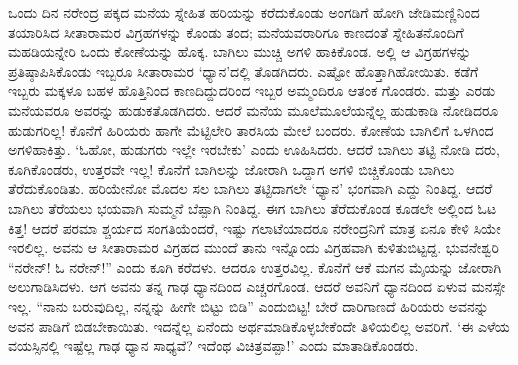 ಒಂದು ದಿನ ನರೇಂದ್ರ ಪಕ್ಕದ ಮನೆಯ ಸ್ನೇಹಿತ ಹರಿಯನ್ನು ಕರೆದುಕೊಂಡು ಅಂಗಡಿಗೆ ಹೋಗಿ ಜೇಡಿಮಣ್ಣಿನಿಂದ ತಯಾರಿಸಿದ ಸೀತಾರಾಮರ ವಿಗ್ರಹಗಳನ್ನು ಕೊಂಡು ತಂದ; ಮನೆಯವರಾರಿಗೂ ಕಾಣದಂತೆ ಸ್ನೇಹಿತನೊಂದಿಗೆ ಮಹಡಿಯನ್ನೇರಿ ಒಂದು ಕೋಣೆಯನ್ನು ಹೊಕ್ಕ. ಬಾಗಿಲು ಮುಚ್ಚಿ ಅಗಳಿ ಹಾಕಿಕೊಂಡ. ಅಲ್ಲಿ ಆ ವಿಗ್ರಹಗಳನ್ನು ಪ್ರತಿಷ್ಠಾಪಿಸಿಕೊಂಡು ಇಬ್ಬರೂ ಸೀತಾರಾಮರ ‘ಧ್ಯಾನ’ದಲ್ಲಿ ತೊಡಗಿದರು. ಎಷ್ಟೋ ಹೊತ್ತಾಗಿಹೋಯಿತು. ಕಡೆಗೆ ಇಬ್ಬರು ಮಕ್ಕಳೂ ಬಹಳ ಹೊತ್ತಿನಿಂದ ಕಾಣದಿದ್ದುದರಿಂದ ಇಬ್ಬರ ಅಮ್ಮಂದಿರೂ ಆತಂಕ ಗೊಂಡರು. ಮತ್ತು ಎರಡು ಮನೆಯವರೂ ಅವರನ್ನು ಹುಡುಕತೊಡಗಿದರು. ಆದರೆ ಮನೆಯ ಮೂಲೆಮೂಲೆಯನ್ನೆಲ್ಲ ಹುಡುಕಾಡಿ ನೋಡಿದರೂ ಹುಡುಗರಿಲ್ಲ! ಕೊನೆಗೆ ಹಿರಿಯರು ಹಾಗೇ ಮೆಟ್ಟಿಲೇರಿ ತಾರಸಿಯ ಮೇಲೆ ಬಂದರು. ಕೋಣೆಯ ಬಾಗಿಲಿಗೆ ಒಳಗಿಂದ ಅಗಳಿಹಾಕಿತ್ತು. ‘ಓಹೋ, ಹುಡುಗರು ಇಲ್ಲೇ ಇರಬೇಕು’ ಎಂದು ಊಹಿಸಿದರು. ಆದರೆ ಬಾಗಿಲು ತಟ್ಟಿ ನೋಡಿ ದರು, ಕೂಗಿಕೊಂಡರು, ಉತ್ತರವೇ ಇಲ್ಲ! ಕೊನೆಗೆ ಬಾಗಿಲನ್ನು ಜೋರಾಗಿ ಒದ್ದಾಗ ಅಗಳಿ ಬಿಚ್ಚಿಕೊಂಡು ಬಾಗಿಲು ತೆರೆದುಕೊಂಡಿತು. ಹರಿಯೇನೋ ಮೊದಲ ಸಲ ಬಾಗಿಲು ತಟ್ಟಿದಾಗಲೇ ‘ಧ್ಯಾನ’ ಭಂಗವಾಗಿ ಎದ್ದು ನಿಂತಿದ್ದ. ಆದರೆ ಬಾಗಿಲು ತೆರೆಯಲು ಭಯವಾಗಿ ಸುಮ್ಮನೆ ಬೆಪ್ಪಾಗಿ ನಿಂತಿದ್ದ. ಈಗ ಬಾಗಿಲು ತೆರೆದುಕೊಂಡ ಕೂಡಲೇ ಅಲ್ಲಿಂದ ಓಟ ಕಿತ್ತ! ಆದರೆ ಪರಮಾ ಶ್ಚರ್ಯದ ಸಂಗತಿಯೆಂದರೆ, ಇಷ್ಟು ಗಲಾಟೆಯಾದರೂ ನರೇಂದ್ರನಿಗೆ ಮಾತ್ರ ಏನೂ ಕೇಳಿ ಸಿಯೇ ಇರಲಿಲ್ಲ. ಅವನು ಆ ಸೀತಾರಾಮರ ವಿಗ್ರಹದ ಮುಂದೆ ತಾನು ಇನ್ನೊಂದು ವಿಗ್ರಹವಾಗಿ ಕುಳಿತುಬಿಟ್ಟದ್ದ. ಭುವನೇಶ್ವರಿ “ನರೇನ್! ಓ ನರೇನ್!” ಎಂದು ಕೂಗಿ ಕರೆದಳು. ಆದರೂ ಉತ್ತರವಿಲ್ಲ. ಕೊನೆಗೆ ಆಕೆ ಮಗನ ಮೈಯನ್ನು ಜೋರಾಗಿ ಅಲುಗಾಡಿಸಿದಳು. ಆಗ ಅವನು ತನ್ನ ಗಾಢ ಧ್ಯಾನದಿಂದ ಎಚ್ಚರಗೊಂಡ. ಆದರೆ ಅವನಿಗೆ ಧ್ಯಾನದಿಂದ ಏಳುವ ಮನಸ್ಸೇ ಇಲ್ಲ. “ನಾನು ಬರುವುದಿಲ್ಲ, ನನ್ನನ್ನು ಹೀಗೇ ಬಿಟ್ಟು ಬಿಡಿ” ಎಂದುಬಿಟ್ಟ! ಬೇರೆ ದಾರಿಗಾಣದೆ ಹಿರಿಯರು ಅವನನ್ನು ಅವನ ಪಾಡಿಗೆ ಬಿಡಬೇಕಾಯಿತು. ಇದನ್ನೆಲ್ಲ ಏನೆಂದು ಅರ್ಥಮಾಡಿಕೊಳ್ಳಬೇಕೆಂದೇ ತಿಳಿಯಲಿಲ್ಲ ಅವರಿಗೆ. ‘ಈ ಎಳೆಯ ವಯಸ್ಸಿನಲ್ಲಿ ಇಷ್ಟೆಲ್ಲ ಗಾಢ ಧ್ಯಾನ ಸಾಧ್ಯವೆ? ಇದೆಂಥ ವಿಚಿತ್ರವಪ್ಪಾ!’ ಎಂದು ಮಾತಾಡಿಕೊಂಡರು.


